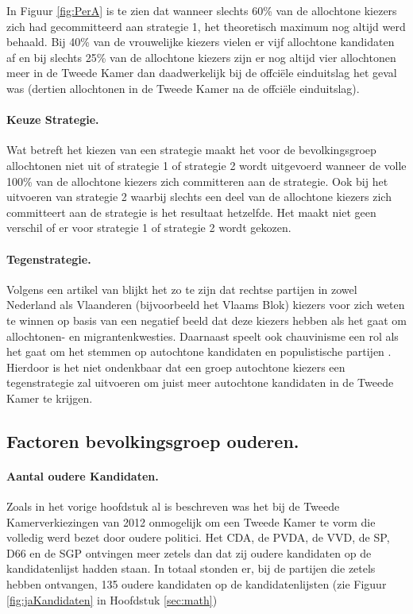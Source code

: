 In Figuur \ref{fig:PerA} is te zien dat wanneer slechts 60\% van de allochtone kiezers zich had gecommitteerd aan strategie 1, het theoretisch maximum nog altijd werd behaald. Bij 40\% van de vrouwelijke kiezers vielen er vijf allochtone kandidaten af en bij slechts 25\% van de allochtone kiezers zijn er nog altijd vier allochtonen meer in de Tweede Kamer dan daadwerkelijk bij de offci\"{e}le einduitslag het geval was (dertien allochtonen in de Tweede Kamer na de offci\"{e}le einduitslag). 


\paragraph{Keuze Strategie.}
Wat betreft het kiezen van een strategie maakt het voor de bevolkingsgroep allochtonen niet uit of strategie 1 of strategie 2 wordt uitgevoerd wanneer de volle 100\% van de allochtone kiezers zich committeren aan de strategie. Ook bij het uitvoeren van strategie 2 waarbij slechts een deel van de allochtone kiezers zich committeert aan de strategie is het resultaat hetzelfde. Het maakt niet geen verschil of er voor strategie 1 of strategie 2 wordt gekozen. 


\paragraph{Tegenstrategie.}
Volgens een artikel van \cite{de2000political} blijkt het zo te zijn dat rechtse partijen in zowel Nederland als Vlaanderen (bijvoorbeeld het Vlaams Blok) kiezers voor zich weten te winnen op basis van een negatief beeld dat deze kiezers hebben als het gaat om allochtonen- en migrantenkwesties. Daarnaast speelt ook chauvinisme een rol als het gaat om het stemmen op autochtone kandidaten en populistische partijen \citep{van2010swaying}. Hierdoor is het niet ondenkbaar dat een groep autochtone kiezers een tegenstrategie zal uitvoeren om juist meer autochtone kandidaten in de Tweede Kamer te krijgen.

\subsection{Factoren bevolkingsgroep ouderen.}
\label{percO}

\paragraph{Aantal oudere Kandidaten.} 
Zoals in het vorige hoofdstuk al is beschreven was het bij de Tweede Kamerverkiezingen van 2012 onmogelijk om een Tweede Kamer te vorm die volledig werd bezet door oudere politici. Het CDA, de PVDA, de VVD, de SP, D66 en de SGP ontvingen meer zetels dan dat zij oudere kandidaten op de kandidatenlijst hadden staan. In totaal stonden er, bij de partijen die zetels hebben ontvangen, 135 oudere kandidaten op de kandidatenlijsten (zie Figuur \ref{fig:jaKandidaten} in Hoofdstuk \ref{sec:math})

